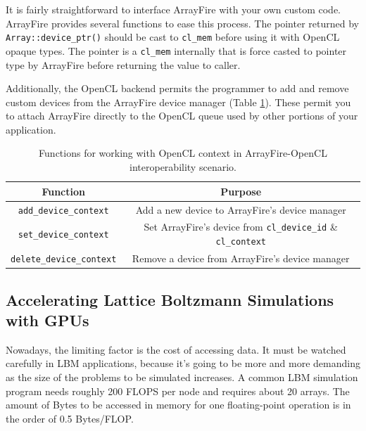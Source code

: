 It is fairly straightforward to interface ArrayFire with your own custom code. ArrayFire provides several functions to ease this process. The pointer returned by \texttt{Array::device_ptr()} should be cast to \texttt{cl_mem} before using it with OpenCL opaque types. The pointer is a \texttt{cl_mem} internally that is force casted to pointer type by ArrayFire before returning the value to caller.

Additionally, the OpenCL backend permits the programmer to add and remove custom devices from the ArrayFire device manager (Table \ref{table:afcl}). These permit you to attach ArrayFire directly to the OpenCL queue used by other portions of your application.

\begin{table}[h!]
	\centering\small
	{\renewcommand{\arraystretch}{1.1}%
		{\setlength{\tabcolsep}{0.4em}
	\begin{tabular}{|c|c|} 
		\hline
		Function & Purpose \\
		\hline
		\texttt{add_device_context} & Add a new device to ArrayFire's device manager \\ 
		\hline
		\texttt{set_device_context} & Set ArrayFire's device from \texttt{cl_device_id} \& \texttt{cl_context} \\
		\hline
		\texttt{delete_device_context} & Remove a device from ArrayFire's device manager \\
		\hline
	\end{tabular}}}
	\caption{Functions for working with OpenCL context in ArrayFire-OpenCL interoperability scenario.}
	\label{table:afcl}
\end{table}

\subsection{Accelerating Lattice Boltzmann Simulations with GPUs}



Nowadays, the limiting factor is the cost of accessing data. It must be watched carefully in LBM applications, because it's going to be more and more demanding as the size of the problems to be simulated increases. A common LBM simulation program needs roughly 200 FLOPS per node and requires about 20 arrays. The amount of Bytes to be accessed in memory for one floating-point operation is in the order of 0.5 Bytes/FLOP. 

